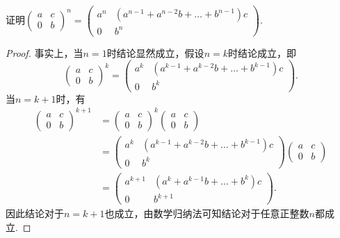 \begin{enumerate}
          \begin{example}
              证明$\begin{pmatrix}
                      a & c \\ 0 & b
                  \end{pmatrix}^n=\begin{pmatrix}
                      a^n & (a^{n-1}+a^{n-2}b+\dots+b^{n-1})c \\ 0 & b^n
                  \end{pmatrix}$.
          \end{example}
          \begin{proof}
                事实上，当$n=1$时结论显然成立，假设$n=k$时结论成立，即
                \[\begin{pmatrix}
                        a & c \\ 0 & b
                    \end{pmatrix}^k=\begin{pmatrix}
                        a^k & (a^{k-1}+a^{k-2}b+\dots+b^{k-1})c \\ 0 & b^k
                    \end{pmatrix}.\]
                当$n=k+1$时，有
                \begin{align*}
                    \begin{pmatrix}
                        a & c \\ 0 & b
                    \end{pmatrix}^{k+1}&=\begin{pmatrix}
                        a & c \\ 0 & b
                    \end{pmatrix}^k\begin{pmatrix}
                        a & c \\ 0 & b
                    \end{pmatrix} \\
                    &=\begin{pmatrix}
                        a^k & (a^{k-1}+a^{k-2}b+\dots+b^{k-1})c \\ 0 & b^k
                    \end{pmatrix}\begin{pmatrix}
                        a & c \\ 0 & b
                    \end{pmatrix} \\
                    &=\begin{pmatrix}
                        a^{k+1} & (a^k+a^{k-1}b+\dots+b^k)c \\
                        0 & b^{k+1}
                    \end{pmatrix}.
                \end{align*}
                因此结论对于$n=k+1$也成立，由数学归纳法可知结论对于任意正整数$n$都成立.
          \end{proof}


\end{enumerate}
